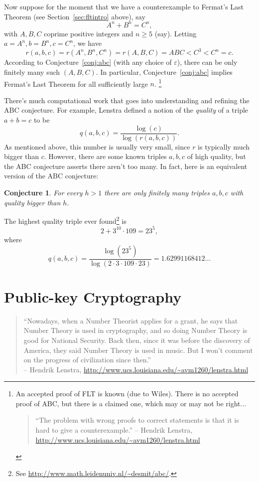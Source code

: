 \documentclass{book}
\theoremstyle{plain}
\newtheorem{conjecture}[theorem]{Conjecture}
\theoremstyle{definition}
\numberwithin{equation}{section}
\numberwithin{figure}{section}
\numberwithin{table}{section}
\newcommand{\eps}{\varepsilon}
\begin{document}
Now suppose for the moment that we have a counterexample
to Fermat's Last Theorem (see Section~\ref{sec:fltintro} above),
say
$$
 A^n + B^n = C^n,
$$
with $A,B,C$ coprime positive integers and $n\ge 5$ (say).
Letting $a=A^n, b=B^n, c=C^n$, we have
$$
r(a,b,c) = r(A^n,B^n,C^n) = r(A,B,C) = ABC <C^3 < C^n=c.
$$
According to Conjecture~\ref{conj:abc} (with
any choice of $\eps$), there can be only finitely many such
$(A,B,C)$.  In particular, Conjecture~\ref{conj:abc} implies
Fermat's Last Theorem for all sufficiently large $n$.
\footnote{An accepted proof of FLT is known (due to Wiles). There
is no accepted proof of ABC, but there is a claimed one,
which may or may not be right...
\begin{quote}
``The problem with wrong proofs to correct statements is that it is hard to give a counterexample.'' -- Hendrik Lenstra, \url{http://www.ucs.louisiana.edu/~avm1260/lenstra.html}
\end{quote}}

There's much computational work that goes into understanding
and refining the ABC conjecture.  For example,
Lenstra defined a notion of the {\em quality} of
a triple $a+b=c$ to be
$$q(a,b,c) = \frac{\log(c)}{\log(r(a,b,c))}.$$
As mentioned above, this number is usually very small, since
$r$ is typically much bigger than $c$.
However, there are some known triples $a,b,c$ of
high quality, but the ABC conjecture asserts there aren't too
many.  In fact, here is an equivalent version of the ABC conjecture:
\begin{conjecture}
For every $h>1$ there are only finitely many triples
$a,b,c$ with quality bigger than $h$.
\end{conjecture}

The highest quality triple ever found\footnote{See \url{http://www.math.leidenuniv.nl/~desmit/abc/}.} is
$$
   2 + 3^{10}\cdot 109 = 23^5,
$$
where
$$
q(a,b,c) = \frac{\log(23^5)}{\log(2\cdot 3 \cdot 109 \cdot 23)}
    = 1.62991168412\ldots
$$


\section{Public-key Cryptography}


\begin{quote}
``Nowadays, when a Number Theorist applies for a grant, he says
that Number Theory is used in cryptography, and so doing Number
Theory is good for National Security. Back then, since it was
before the discovery of America, they said Number Theory is
used in music. But I won't comment on the progress of
civilization since then.''\\-- Hendrik Lenstra, \url{http://www.ucs.louisiana.edu/~avm1260/lenstra.html}
\end{quote}
\end{document}
